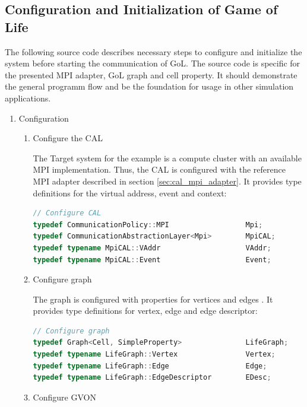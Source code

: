 \subsection{Configuration and Initialization of Game of Life}
The following source code describes necessary steps to configure and
initialize the system before starting the communication of GoL. The
source code is specific for the presented MPI adapter, GoL graph and
cell property. It should demonstrate the general programm flow and be
the foundation for usage in other simulation applications.

\begin{enumerate}

\item Configuration
\begin{enumerate}

\item Configure the CAL
  
  The Target system for the example is a compute cluster with an
  available MPI implementation. Thus, the CAL is configured with the
  reference MPI adapter described in section
  \ref{sec:cal_mpi_adapter}. It provides type definitions for the
  virtual address, event and context:

  \begin{lstlisting}[language=C++, label=lst:conf_cal, caption={\ }]
// Configure CAL
typedef CommunicationPolicy::MPI                  Mpi;
typedef CommunicationAbstractionLayer<Mpi>        MpiCAL;
typedef typename MpiCAL::VAddr                    VAddr;
typedef typename MpiCAL::Event                    Event;
  \end{lstlisting}

\item Configure graph

  The graph is configured with properties for vertices  and
  edges . It provides type definitions for vertex, edge and
  edge descriptor:

  \begin{lstlisting}[language=C++, label=lst:conf_graph, caption={\ }]
// Configure graph
typedef Graph<Cell, SimpleProperty>               LifeGraph;
typedef typename LifeGraph::Vertex                Vertex;
typedef typename LifeGraph::Edge                  Edge;
typedef typename LifeGraph::EdgeDescriptor        EDesc;
  \end{lstlisting}


\item Configure GVON


\end{enumerate}
\end{enumerate}
